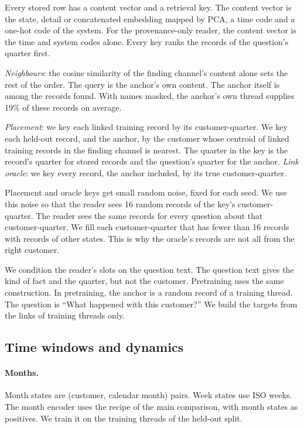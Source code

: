 \documentclass[11pt]{article}
\begin{document}
Every stored row has a content vector and a retrieval key. The content vector is the state, detail or concatenated embedding mapped by PCA, a time code and a one-hot code of the system. For the provenance-only reader, the content vector is the time and system codes alone. Every key ranks the records of the question's quarter first.

\emph{Neighbours}: the cosine similarity of the finding channel's content alone sets the rest of the order. The query is the anchor's own content. The anchor itself is among the records found. With names masked, the anchor's own thread supplies 19\% of these records on average.

\emph{Placement}: we key each linked training record by its customer-quarter. We key each held-out record, and the anchor, by the customer whose centroid of linked training records in the finding channel is nearest. The quarter in the key is the record's quarter for stored records and the question's quarter for the anchor. \emph{Link oracle}: we key every record, the anchor included, by its true customer-quarter.

Placement and oracle keys get small random noise, fixed for each seed. We use this noise so that the reader sees 16 random records of the key's customer-quarter. The reader sees the same records for every question about that customer-quarter. We fill each customer-quarter that has fewer than 16 records with records of other states. This is why the oracle's records are not all from the right customer.

We condition the reader's slots on the question text. The question text gives the kind of fact and the quarter, but not the customer. Pretraining uses the same construction. In pretraining, the anchor is a random record of a training thread. The question is ``What happened with this customer?'' We build the targets from the links of training threads only.

\subsection{Time windows and dynamics}
\paragraph{Months.} Month states are (customer, calendar month) pairs. Week states use ISO weeks. The month encoder uses the recipe of the main comparison, with month states as positives. We train it on the training threads of the held-out split.
\end{document}
